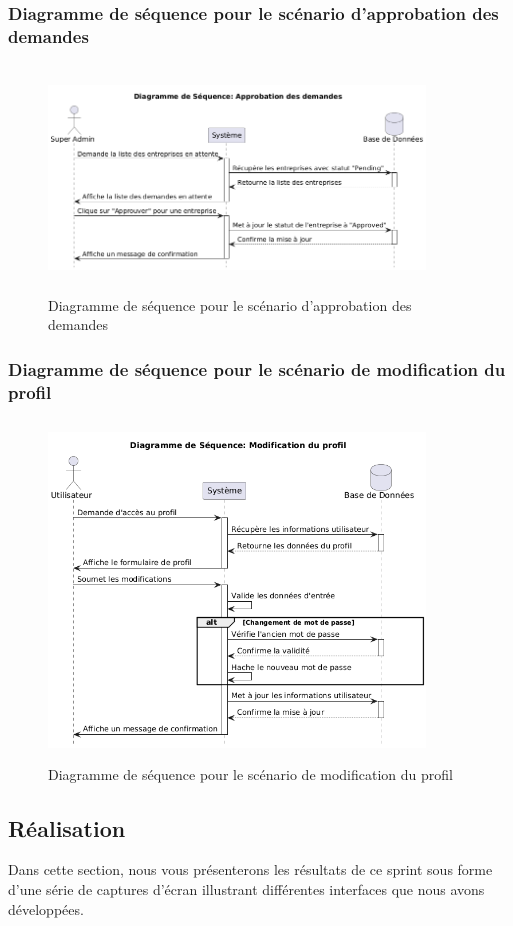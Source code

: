 \subsubsection{Diagramme de séquence pour le scénario d'approbation des demandes}
\begin{figure}[H]
    \centering
    \includegraphics[width=10cm,height=6cm]{images/demandeseq.png}
    \caption{Diagramme de séquence pour le scénario d'approbation des demandes}
\end{figure}

\subsubsection{Diagramme de séquence pour le scénario de modification du profil}
\begin{figure}[H]
    \centering
    \includegraphics[width=10cm,height=9cm]{images/profilseq.png}
    \caption{Diagramme de séquence pour le scénario de modification du profil}
\end{figure}

\subsection{Réalisation}
\noindent Dans cette section, nous vous présenterons les résultats de ce sprint sous forme d'une série de captures d'écran illustrant différentes interfaces que nous avons développées.

